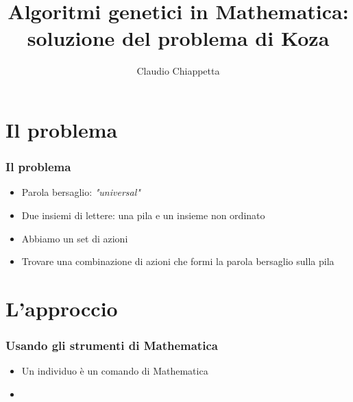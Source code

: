 \documentclass{beamer} %
\title{Algoritmi genetici in Mathematica: soluzione del problema di Koza}
\author{Claudio Chiappetta}
\institute{Università degli studi di Milano}
\date{}%
\begin{document}



\begin{frame}
\titlepage 
\end{frame}

\section{Il problema}
\begin{frame}
\frametitle{Il problema}

\begin{itemize}
\item Parola bersaglio: \emph{"universal"}
\item Due insiemi di lettere: una pila e un insieme non ordinato
\item Abbiamo un set di azioni
\item Trovare una combinazione di azioni che formi la parola bersaglio sulla pila
\end{itemize}
\end{frame}

\section{L'approccio}
\begin{frame}
\frametitle{Usando gli strumenti di Mathematica}
\begin{itemize}
\item Un individuo è un comando di Mathematica
\item 
\end{itemize}
\end{frame}
\end{document}
